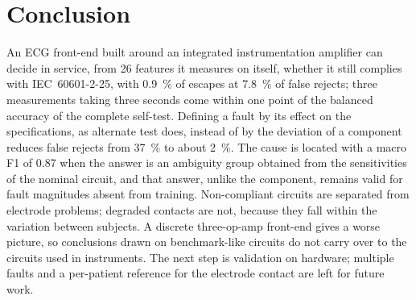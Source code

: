 \section{Conclusion}
\label{sec:conclusion}

An ECG front-end built around an integrated instrumentation amplifier can decide in service, from
26 features it measures on itself, whether it still complies with IEC~60601-2-25, with
\SI{0.9}{\percent} of escapes at \SI{7.8}{\percent} of false rejects; three measurements taking
three seconds come within one point of the balanced accuracy of the complete self-test. Defining
a fault by its effect on the specifications, as alternate test does, instead of by the deviation
of a component reduces false rejects from \SI{37}{\percent} to about \SI{2}{\percent}. The cause
is located with a macro F1 of 0.87 when the answer is an ambiguity group obtained from the
sensitivities of the nominal circuit, and that answer, unlike the component, remains valid for
fault magnitudes absent from training. Non-compliant circuits are separated from electrode
problems; degraded contacts are not, because they fall within the variation between subjects. A
discrete three-op-amp front-end gives a worse picture, so conclusions drawn on benchmark-like
circuits do not carry over to the circuits used in instruments. The next step is validation on
hardware; multiple faults and a per-patient reference for the electrode contact are left for
future work.
